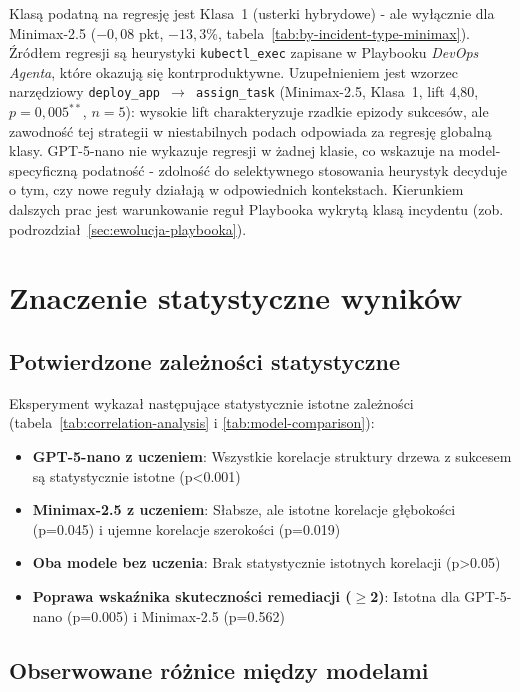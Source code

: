 Klasą podatną na regresję jest Klasa~1 (usterki hybrydowe) - ale wyłącznie dla Minimax-2.5 ($-0{,}08$ pkt, $-13{,}3\%$, tabela~\ref{tab:by-incident-type-minimax}). Źródłem regresji są heurystyki \texttt{kubectl\_exec} zapisane w Playbooku \textit{DevOps Agenta}, które okazują się kontrproduktywne. Uzupełnieniem jest wzorzec narzędziowy \texttt{deploy\_app $\to$ assign\_task} (Minimax-2.5, Klasa~1, lift 4,80, $p=0{,}005^{**}$, $n=5$): wysokie lift charakteryzuje rzadkie epizody sukcesów, ale zawodność tej strategii w niestabilnych podach odpowiada za regresję globalną klasy. GPT-5-nano nie wykazuje regresji w żadnej klasie, co wskazuje na model-specyficzną podatność - zdolność do selektywnego stosowania heurystyk decyduje o tym, czy nowe reguły działają w odpowiednich kontekstach. Kierunkiem dalszych prac jest warunkowanie reguł Playbooka wykrytą klasą incydentu (zob. podrozdział~\ref{sec:ewolucja-playbooka}).

\section{Znaczenie statystyczne wyników}

\subsection{Potwierdzone zależności statystyczne}

Eksperyment wykazał następujące statystycznie istotne zależności (tabela~\ref{tab:correlation-analysis} i \ref{tab:model-comparison}):

\begin{itemize}
    \item \textbf{GPT-5-nano z uczeniem}: Wszystkie korelacje struktury drzewa z sukcesem są statystycznie istotne (p<0.001)
    \item \textbf{Minimax-2.5 z uczeniem}: Słabsze, ale istotne korelacje głębokości (p=0.045) i ujemne korelacje szerokości (p=0.019)
    \item \textbf{Oba modele bez uczenia}: Brak statystycznie istotnych korelacji (p>0.05)
    \item \textbf{Poprawa wskaźnika skuteczności remediacji ($\ge$2)}: Istotna dla GPT-5-nano (p=0.005) i Minimax-2.5 (p=0.562)
\end{itemize}

\subsection{Obserwowane różnice między modelami}

